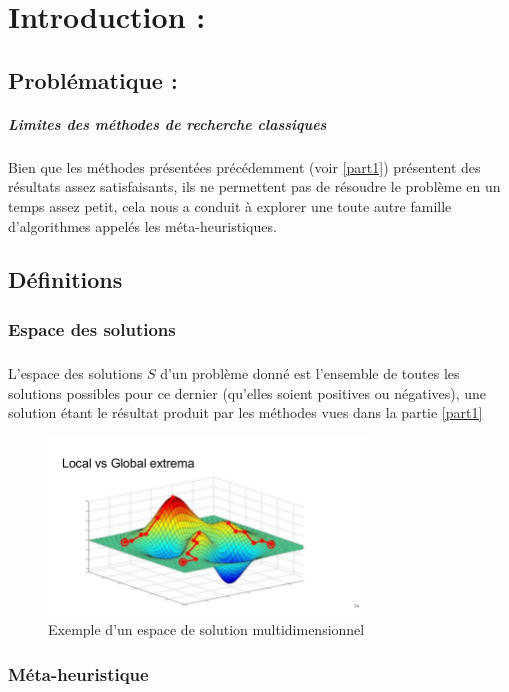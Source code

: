 
\chapter{Introduction : }
	\section{Problématique : }
	\paragraph{Limites des méthodes de recherche classiques}
	Bien que les méthodes présentées précédemment (voir \ref{part1}) présentent des résultats assez satisfaisants, ils ne permettent pas de résoudre le problème en un temps assez petit, cela nous a conduit à explorer une toute autre famille d'algorithmes appelés les méta-heuristiques.
	\section{Définitions}
		\subsection{Espace des solutions}\label{solSpace}
		\paragraph{}
		L'espace des solutions $S$ d'un problème donné est l'ensemble de toutes les solutions possibles pour ce dernier (qu'elles soient positives ou négatives), une solution étant le résultat produit par les méthodes vues dans la partie \ref{part1}
		\begin{figure}[H]
			\centering
			\includegraphics[width=0.75\textwidth]{images/solutionSpace.jpg}
			\caption{Exemple d'un espace de solution multidimensionnel}
		\end{figure}
		\subsection{Méta-heuristique}
